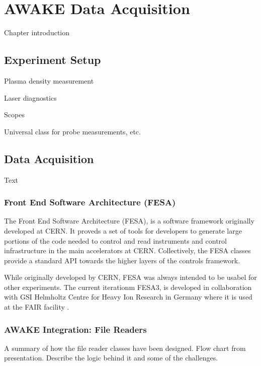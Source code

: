 %
%

\chapter{AWAKE Data Acquisition}
\label{Ch:DAQ}

Chapter introduction

\section{Experiment Setup}
\label{DAQ:Experiment}

Plasma density measurement

Laser diagnostics

Scopes

Universal class for probe measurements, etc.

\section{Data Acquisition}
\label{DAQ:DAQ}

Text

\subsection{Front End Software Architecture (FESA)}
\label{DAQ:FESA}

The Front End Software Architecture (FESA), is a software framework originally developed at CERN. It proveds a set of tools for developers to generate large portions of the code needed to control and read instruments and control infrastructure in the main accelerators at CERN. Collectively, the FESA classes provide a standard API towards the higher layers of the controls framework.

While originally developed by CERN, FESA was always intended to be usabel for other experiments. The current iterationm FESA3, is developed in collaboration with GSI Helmholtz Centre for Heavy Ion Research in Germany where it is used at the FAIR facility \cite{schwinn:2010}.

\subsection{AWAKE Integration: File Readers}
\label{DAQ:Integration}

A summary of how the file reader classes have been designed. Flow chart from presentation. Describe the logic behind it and some of the challenges.

